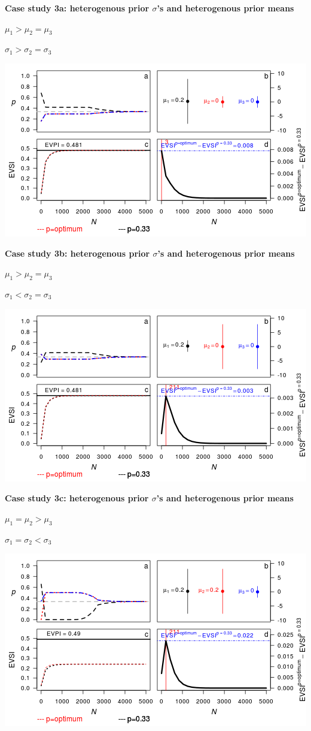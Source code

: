 \documentclass[]{article}
\theoremstyle{definition}
\theoremstyle{definition}
\theoremstyle{remark}
\begin{document}
\textbf{Case study 3a: heterogenous prior \(\sigma\)'s and heterogenous
prior means}

\(\mu_1 > \mu_2 = \mu_3\)

\(\sigma_1 > \sigma_2 = \sigma_3\)

\includegraphics{figure/x100___1_1_1c-1.png} \clearpage

\textbf{Case study 3b: heterogenous prior \(\sigma\)'s and heterogenous
prior means}

\(\mu_1 > \mu_2 = \mu_3\)

\(\sigma_1 < \sigma_2 = \sigma_3\)

\includegraphics{figure/x1001_1_1c-1.png} \clearpage

\textbf{Case study 3c: heterogenous prior \(\sigma\)'s and heterogenous
prior means}

\(\mu_1 = \mu_2 > \mu_3\)

\(\sigma_1 = \sigma_2 < \sigma_3\)

\includegraphics{figure/x110__1__1_1c-1.png} \clearpage
\end{document}
